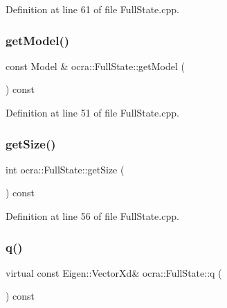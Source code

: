 Definition at line 61 of file Full\+State.\+cpp.

\hypertarget{classocra_1_1FullState_a97f2718a0f72e69c829d67db4514af68}{}\label{classocra_1_1FullState_a97f2718a0f72e69c829d67db4514af68} 
\subsubsection{\texorpdfstring{get\+Model()}{getModel()}}
{\footnotesize\ttfamily const Model \& ocra\+::\+Full\+State\+::get\+Model (\begin{DoxyParamCaption}{ }\end{DoxyParamCaption}) const}



Definition at line 51 of file Full\+State.\+cpp.

\hypertarget{classocra_1_1FullState_a64f03f9385b36840d23e06de18a40112}{}\label{classocra_1_1FullState_a64f03f9385b36840d23e06de18a40112} 
\subsubsection{\texorpdfstring{get\+Size()}{getSize()}}
{\footnotesize\ttfamily int ocra\+::\+Full\+State\+::get\+Size (\begin{DoxyParamCaption}{ }\end{DoxyParamCaption}) const}



Definition at line 56 of file Full\+State.\+cpp.

\hypertarget{classocra_1_1FullState_a3bb03b513d7cb3a5447d1d4eb2d643b0}{}\label{classocra_1_1FullState_a3bb03b513d7cb3a5447d1d4eb2d643b0} 
\subsubsection{\texorpdfstring{q()}{q()}}
{\footnotesize\ttfamily virtual const Eigen\+::\+Vector\+Xd\& ocra\+::\+Full\+State\+::q (\begin{DoxyParamCaption}{ }\end{DoxyParamCaption}) const\hspace{0.3cm}{\ttfamily [pure virtual]}}



